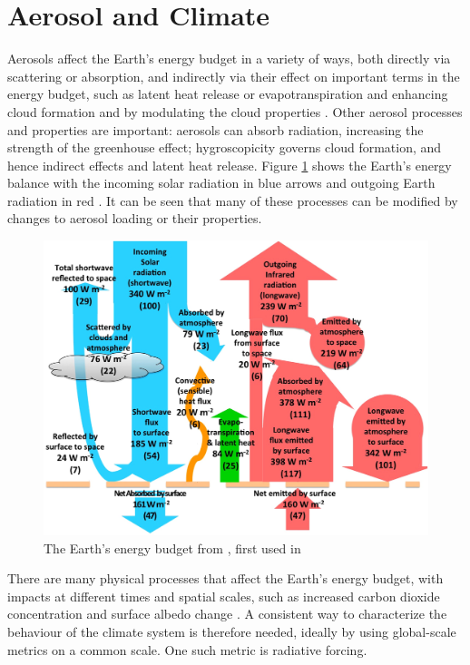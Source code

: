 \section{Aerosol and Climate} %

Aerosols affect the Earth’s energy budget in a variety of ways, both directly via scattering or absorption, and indirectly via their effect on important terms in the energy budget, such as latent heat release or evapotranspiration and enhancing cloud formation and by modulating the cloud properties \citep{readGlobalEnergyBudgets2016}.  Other aerosol processes and properties are important: aerosols can absorb radiation, increasing the strength of the greenhouse effect; hygroscopicity governs cloud formation, and hence indirect effects and latent heat release. Figure \ref{fig:trenberth} shows the Earth's energy balance with the incoming solar radiation in blue arrows and outgoing Earth radiation in red \citep{kiehlEarthAnnualGlobal1997}.  It can be seen that many of these processes can be modified by changes to aerosol loading or their properties. 

\begin{figure}
    \centering
    \includegraphics[width=0.7\columnwidth]{Chapter1/figs/01_trenberth.jpg}
    \caption[The Earth’s energy budget]{The Earth’s energy budget from \citet{readGlobalEnergyBudgets2016}, first used in \citet{kiehlEarthAnnualGlobal1997}}
    \label{fig:trenberth}
\end{figure}


There are many physical processes that affect the Earth's energy budget, with impacts at different times and spatial scales, such as increased carbon dioxide concentration and surface albedo change \citep{forsterEarthEnergyBudget2021}. A consistent way to characterize the behaviour of the climate system is therefore needed, ideally by using global-scale metrics on a common scale. One such metric is radiative forcing.

